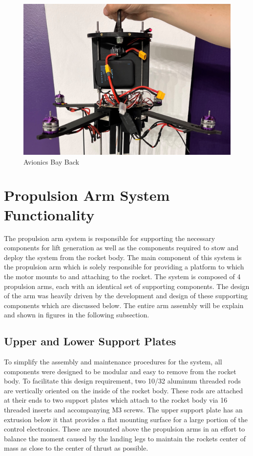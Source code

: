 \begin{figure}[H]
    \centering
    \includegraphics[width=\textwidth]{src/figs/AVBay_Back.jpg}
    \caption{Avionics Bay Back}
    \label{fig:AVB}
\end{figure}




\section{Propulsion Arm System Functionality}
The propulsion arm system is responsible for supporting the necessary components for lift generation as well as the components required to stow and deploy the system from the rocket body. The main component of this system is the propulsion arm which is solely responsible for providing a platform to which the motor mounts to and attaching to the rocket. The system is composed of 4 propulsion arms, each with an identical set of supporting components. The design of the arm was heavily driven by the development and design of these supporting components which are discussed below. The entire arm assembly will be explain and shown in figures in the following subsection.


\subsection{Upper and Lower Support Plates}
To simplify the assembly and maintenance procedures for the system, all components were designed to be modular and easy to remove from the rocket body. To facilitate this design requirement, two 10/32 aluminum threaded rods are vertically oriented on the inside of the rocket body. These rods are attached at their ends to two support plates which attach to the rocket body via 16 threaded inserts and accompanying M3 screws. The upper support plate has an extrusion below it that provides a flat mounting surface for a large portion of the control electronics. These are mounted above the propulsion arms in an effort to balance the moment caused by the landing legs to maintain the rockets center of mass as close to the center of thrust as possible.

